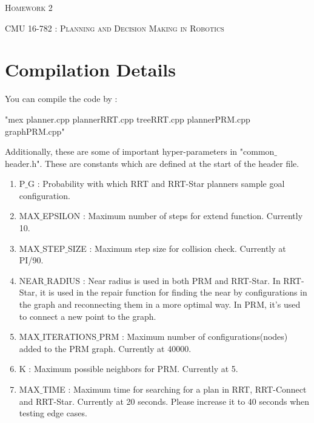 \documentclass[12pt]{article}
\begin{document}
\begin{center}
  \centerline{\textsc{\LARGE  Homework 2}}
  \vspace{1em}
  \textsc{\large CMU 16-782 : Planning and Decision Making in Robotics} \\
\end{center}

\section{Compilation Details}
You can compile the code by :
\begin{center}
    "mex planner.cpp plannerRRT.cpp treeRRT.cpp plannerPRM.cpp graphPRM.cpp" 
\end{center}
Additionally, these are some of important hyper-parameters in "common$\_$header.h". These are constants which are defined at the start of the header file.
\begin{enumerate}
    \item P$\_$G : Probability with which RRT and RRT-Star planners sample goal configuration.
    \item MAX$\_$EPSILON : Maximum number of steps for extend function. Currently 10.
    \item MAX$\_$STEP$\_$SIZE : Maximum step size for collision check. Currently at PI/90.
    \item NEAR$\_$RADIUS : Near radius is used in both PRM and RRT-Star. In RRT-Star, it is used in the repair function for finding the near by configurations in the graph and reconnecting them in a more optimal way. In PRM, it's used to connect a new point to the graph.
    \item MAX$\_$ITERATIONS$\_$PRM : Maximum number of configurations(nodes) added to the PRM graph. Currently at 40000.
    \item K : Maximum possible neighbors for PRM. Currently at 5.
    \item MAX$\_$TIME : Maximum time for searching for a plan in RRT, RRT-Connect and RRT-Star. Currently at 20 seconds. Please increase it to 40 seconds when testing edge cases.
    
\end{enumerate}
\end{document}
